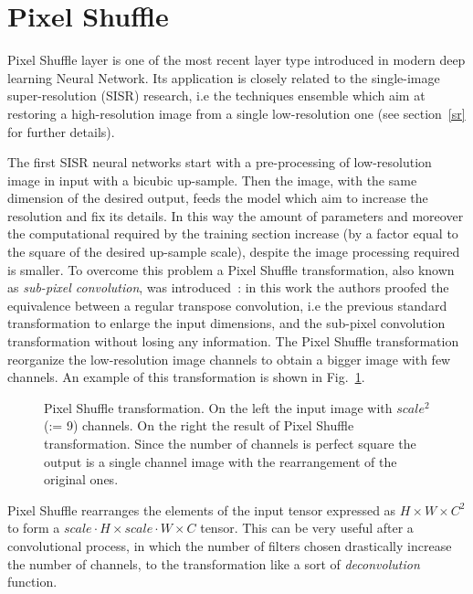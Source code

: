 \documentclass{standalone}
\begin{document}

\section[Pixel Shuffle]{Pixel Shuffle}\label{shuffler}

Pixel Shuffle layer is one of the most recent layer type introduced in modern deep learning Neural Network.
Its application is closely related to the single-image super-resolution (SISR) research, i.e the techniques ensemble which aim at restoring a high-resolution image from a single low-resolution one (see section~\ref{sr} for further details).

The first SISR neural networks start with a pre-processing of low-resolution image in input with a bicubic up-sample.
Then the image, with the same dimension of the desired output, feeds the model which aim to increase the resolution and fix its details.
In this way the amount of parameters and moreover the computational required by the training section increase (by a factor equal to the square of the desired up-sample scale), despite the image processing required is smaller.
To overcome this problem a Pixel Shuffle transformation, also known as \emph{sub-pixel convolution}, was introduced~\cite{Wenzhe2016Shuffle}: in this work the authors proofed the equivalence between a regular transpose convolution, i.e the previous standard transformation to enlarge the input dimensions, and the sub-pixel convolution transformation without losing any information.
The Pixel Shuffle transformation reorganize the low-resolution image channels to obtain a bigger image with few channels.
An example of this transformation is shown in Fig.~\ref{fig:pixel_shuffle}.

\begin{figure}[htbp]
\centering
\def\svgwidth{0.7\textwidth}

\caption{Pixel Shuffle transformation.
On the left the input image with $scale^2$ (:= 9) channels.
On the right the result of Pixel Shuffle transformation.
Since the number of channels is perfect square the output is a single channel image with the rearrangement of the original ones.
}
\label{fig:pixel_shuffle}
\end{figure}

Pixel Shuffle rearranges the elements of the input tensor expressed as $H \times W \times C^2$ to form a $scale \cdot H \times scale \cdot W \times C$ tensor.
This can be very useful after a convolutional process, in which the number of filters chosen drastically increase the number of channels, to  the transformation like a sort of \emph{deconvolution} function.
\end{document}
